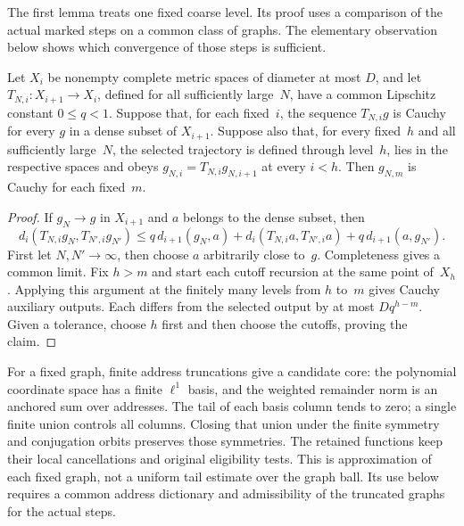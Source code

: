 The first lemma treats one fixed coarse level. Its proof uses a comparison of the actual marked steps on a common class of graphs. The elementary observation below shows which convergence of those steps is sufficient.
\begin{lemma}\label{lem:E-common-core}
Let $X_i$ be nonempty complete metric spaces of diameter at most $D$, and let $T_{N,i}:X_{i+1}\to X_i$, defined for all sufficiently large~$N$, have a common Lipschitz constant $0\le q<1$. Suppose that, for each fixed~$i$, the sequence $T_{N,i}g$ is Cauchy for every $g$ in a dense subset of $X_{i+1}$. Suppose also that, for every fixed~$h$ and all sufficiently large~$N$, the selected trajectory is defined through level~$h$, lies in the respective spaces and obeys $g_{N,i}=T_{N,i}g_{N,i+1}$ at every $i<h$. Then $g_{N,m}$ is Cauchy for each fixed~$m$.
\end{lemma}
\begin{proof}
If $g_N\to g$ in $X_{i+1}$ and $a$ belongs to the dense subset, then
\[
 d_i(T_{N,i}g_N,T_{N',i}g_{N'})
 \le q\,d_{i+1}(g_N,a)+d_i(T_{N,i}a,T_{N',i}a)
       +q\,d_{i+1}(a,g_{N'}).
\]
First let $N,N'\to\infty$, then choose $a$ arbitrarily close to~$g$. Completeness gives a common limit. Fix $h>m$ and start each cutoff recursion at the same point of~$X_h$. Applying this argument at the finitely many levels from $h$ to~$m$ gives Cauchy auxiliary outputs. Each differs from the selected output by at most $Dq^{h-m}$. Given a tolerance, choose $h$ first and then choose the cutoffs, proving the claim.
\end{proof}

For a fixed graph, finite address truncations give a candidate core: the polynomial coordinate space has a finite $\ell^1$ basis, and the weighted remainder norm is an anchored sum over addresses. The tail of each basis column tends to zero; a single finite union controls all columns. Closing that union under the finite symmetry and conjugation orbits preserves those symmetries. The retained functions keep their local cancellations and original eligibility tests. This is approximation of each fixed graph, not a uniform tail estimate over the graph ball. Its use below requires a common address dictionary and admissibility of the truncated graphs for the actual steps.

